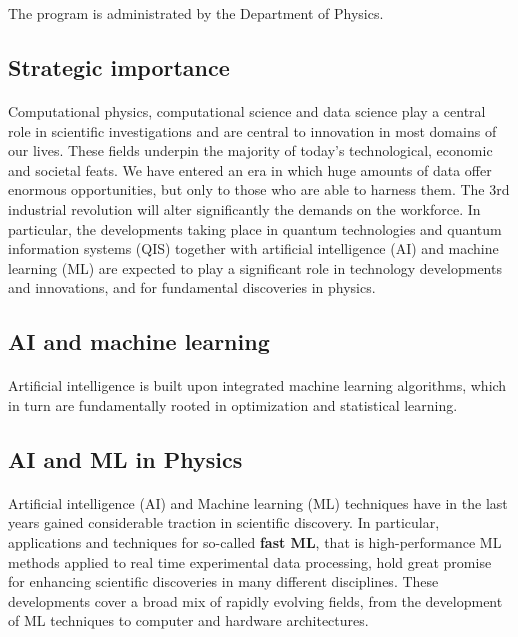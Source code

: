 \documentclass[%
oneside,                 %
final,                   %
10pt]{article}
\begin{document}
\noindent
The program is  administrated by the Department of Physics.



\subsection*{Strategic importance}


\paragraph{}
Computational physics, computational science and data science play a
central role in scientific investigations and are central to
innovation in most domains of our lives. These fields underpin the
majority of today's technological, economic and societal feats. We
have entered an era in which huge amounts of data offer enormous
opportunities, but only to those who are able to harness them. The 3rd
industrial revolution will alter significantly the demands on the
workforce. In particular, the developments taking place in quantum
technologies and quantum information systems (QIS) together with
artificial intelligence (AI) and machine learning (ML) are expected to
play a significant role in technology developments and innovations,
and for fundamental discoveries in physics.



\subsection*{AI and machine learning}


\paragraph{}
Artificial
intelligence is built upon integrated machine learning algorithms,
which in turn are fundamentally rooted in optimization and statistical
learning.



\subsection*{AI and ML in Physics}


\paragraph{}
Artificial intelligence (AI) and Machine learning (ML)  techniques
have in the last years gained considerable traction in
scientific discovery. In particular, applications and techniques for
so-called \textbf{fast ML}, that is high-performance ML methods applied
to real time experimental data processing, hold great promise for
enhancing scientific discoveries in many different disciplines.
These developments cover a broad mix of rapidly
evolving fields, from the development of ML techniques to computer and
hardware architectures.
\end{document}
